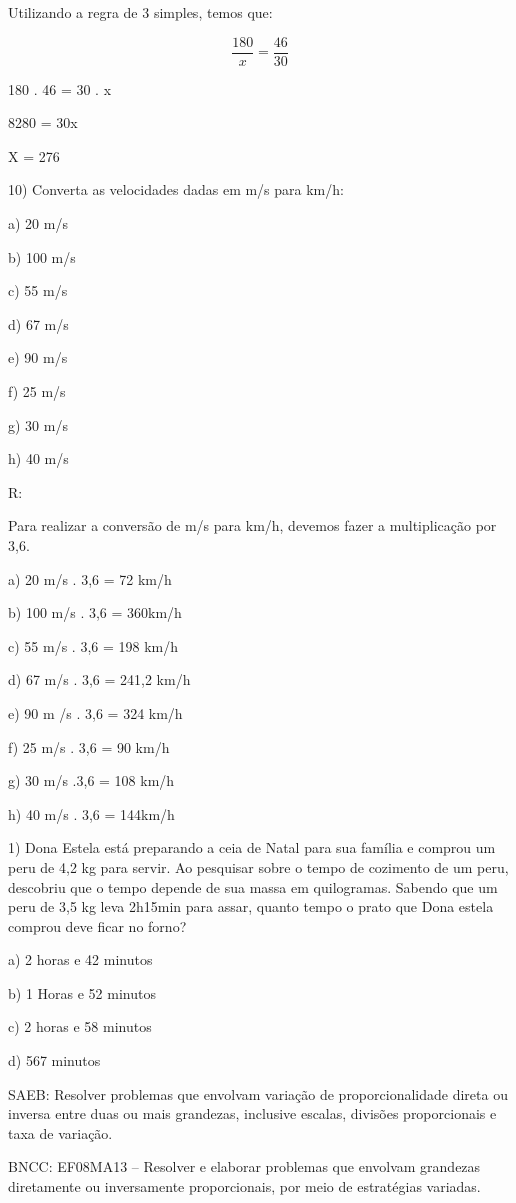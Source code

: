 Utilizando a regra de 3 simples, temos que:

\[\frac {180}{x} = \frac{46}{30}\]

180 . 46 = 30 . x

8280 = 30x

X = 276

10) Converta as velocidades dadas em m/s para km/h:

a) 20 m/s

b) 100 m/s

c) 55 m/s

d) 67 m/s

e) 90 m/s

f) 25 m/s

g) 30 m/s

h) 40 m/s

R:

Para realizar a conversão de m/s para km/h, devemos fazer a
multiplicação por 3,6.

a) 20 m/s . 3,6 = 72 km/h

b) 100 m/s . 3,6 = 360km/h

c) 55 m/s . 3,6 = 198 km/h

d) 67 m/s . 3,6 = 241,2 km/h

e) 90 m /s . 3,6 = 324 km/h

f) 25 m/s . 3,6 = 90 km/h

g) 30 m/s .3,6 = 108 km/h

h) 40 m/s . 3,6 = 144km/h


1) Dona Estela está preparando a ceia de Natal para sua família e
comprou um peru de 4,2 kg para servir. Ao pesquisar sobre o tempo de
cozimento de um peru, descobriu que o tempo depende de sua massa em
quilogramas. Sabendo que um peru de 3,5 kg leva 2h15min para assar,
quanto tempo o prato que Dona estela comprou deve ficar no forno?

a) 2 horas e 42 minutos

b) 1 Horas e 52 minutos

c) 2 horas e 58 minutos

d) 567 minutos

SAEB: Resolver problemas que envolvam variação de proporcionalidade
direta ou inversa entre duas ou mais grandezas, inclusive escalas,
divisões proporcionais e taxa de variação.

BNCC: EF08MA13 -- Resolver e elaborar problemas que envolvam grandezas
diretamente ou inversamente proporcionais, por meio de estratégias
variadas.

